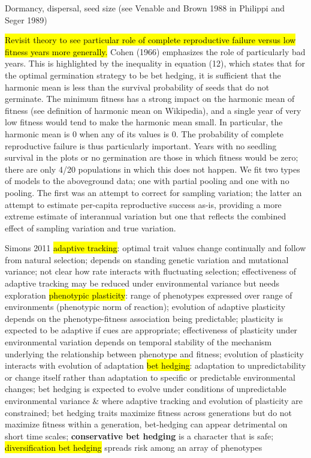 \documentclass[12pt, oneside, titlepage]{article}   	%
\begin{document}
{\iffalse
Dormancy, dispersal, seed size (see Venable and Brown 1988 in Philippi and Seger 1989)


\hl{Revisit theory to see particular role of complete reproductive failure versus low fitness years more generally.} Cohen (1966) emphasizes the role of particularly bad years. This is highlighted by the inequality in equation (12), which states that for the optimal germination strategy to be bet hedging, it is sufficient that the harmonic mean is less than the survival probability of seeds that do not germinate. The minimum fitness has a strong impact on the harmonic mean of fitness (see definition of harmonic mean on Wikipedia), and a single year of very low fitness would tend to make the harmonic mean small. In particular, the harmonic mean is 0 when any of its values is 0. The probability of complete reproductive failure is thus particularly important. Years with no seedling survival in the plots or no germination are those in which fitness would be zero; there are only 4/20 populations in which this does not happen. We fit two types of models to the aboveground data; one with partial pooling and one with no pooling. The first was an attempt to correct for sampling variation; the latter an attempt to estimate per-capita reproductive success as-is, providing a more extreme estimate of interannual variation but one that reflects the combined effect of sampling variation and true variation.



Simons 2011
\hl{adaptive tracking}: optimal trait values change continually and follow from natural selection; depends on standing genetic variation and mutational variance; not clear how rate interacts with fluctuating selection; effectiveness of adaptive tracking may be reduced under environmental variance but needs exploration
\hl{phenotypic plasticity}: range of phenotypes expressed over range of environments (phenotypic norm of reaction); evolution of adaptive plasticity depends on the phenotype-fitness association being predictable; plasticity is expected to be adaptive if cues are appropriate; effectiveness of plasticity under environmental variation depends on temporal stability of the mechanism underlying the relationship between phenotype and fitness; evolution of plasticity interacts with evolution of adaptation
\hl{bet hedging}: adaptation to unpredictability or change itself rather than adaptation to specific or predictable environmental changes; bet hedging is expected to evolve under conditions of unpredictable environmental variance \& where adaptive tracking and evolution of plasticity are constrained; bet hedging traits maximize fitness across generations but do not maximize fitness within a generation, bet-hedging can appear detrimental on short time scales; \textbf{conservative bet hedging} is a character that is safe; \hl{diversification bet hedging} spreads risk among an array of phenotypes

}
\end{document}

